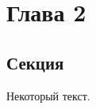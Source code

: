 \chapter{Глава 2}\label{ch:ch2}

\section{Секция}\label{sec:ch2/sec1}

Некоторый текст.

\FloatBarrier

